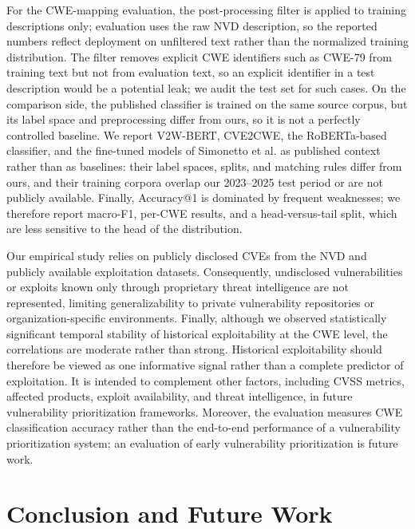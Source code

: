 \documentclass[conference,compsoc]{IEEEtran}
\begin{document}
For the CWE-mapping evaluation, the post-processing filter is applied to training descriptions only; evaluation uses the raw NVD description, so the reported numbers reflect deployment on unfiltered text rather than the normalized training distribution. The filter removes explicit CWE identifiers such as CWE-79 from training text but not from evaluation text, so an explicit identifier in a test description would be a potential leak; we audit the test set for such cases. On the comparison side, the published classifier is trained on the same source corpus, but its label space and preprocessing differ from ours, so it is not a perfectly controlled baseline. We report V2W-BERT, CVE2CWE, the RoBERTa-based classifier, and the fine-tuned models of Simonetto et al. as published context rather than as baselines: their label spaces, splits, and matching rules differ from ours, and their training corpora overlap our 2023--2025 test period or are not publicly available. Finally, Accuracy@1 is dominated by frequent weaknesses; we therefore report macro-F1, per-CWE results, and a head-versus-tail split, which are less sensitive to the head of the distribution.

Our empirical study relies on publicly disclosed CVEs from the NVD and publicly available exploitation datasets. Consequently, undisclosed vulnerabilities or exploits known only through proprietary threat intelligence are not represented, limiting generalizability to private vulnerability repositories or organization-specific environments. Finally, although we observed statistically significant temporal stability of historical exploitability at the CWE level, the correlations are moderate rather than strong. Historical exploitability should therefore be viewed as one informative signal rather than a complete predictor of exploitation. It is intended to complement other factors, including CVSS metrics, affected products, exploit availability, and threat intelligence, in future vulnerability prioritization frameworks. Moreover, the evaluation measures CWE classification accuracy rather than the end-to-end performance of a vulnerability prioritization system; an evaluation of early vulnerability prioritization is future work.

\section{Conclusion and Future Work}
\label{sec:conclusion}
\end{document}

